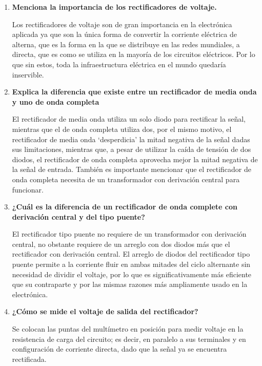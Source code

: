\documentclass[12pt]{article}
\begin{document}
        \begin{enumerate}
            \item \textbf{Menciona la importancia de los rectificadores de voltaje.}\par
                Los rectificadores de voltaje son de gran importancia en la electrónica aplicada ya que son la única forma de convertir
                la corriente eléctrica de alterna, que es la forma en la que se distribuye en las redes mundiales, a directa, que es como 
                se utiliza en la mayoría de los circuitos eléctricos. Por lo que sin estos, toda la infraestructura eléctrica en el mundo quedaría inservible. 
            \item \textbf{Explica la diferencia que existe entre un rectificador de media onda y uno de onda completa}\par
                El rectificador de media onda utiliza un solo diodo para rectificar la señal, mientras que el de onda completa utiliza dos, por el mismo motivo,
                el rectificador de media onda `desperdicia' la mitad negativa de la señal dadas sus limitaciones, mientras que, a pesar de utilizar la caída de tensión de
                dos diodos, el rectificador de onda completa aprovecha mejor la mitad negativa de la señal de entrada. También es importante mencionar que el rectificador de onda completa necesita de 
                un transformador con derivación central para funcionar.
            \item \textbf{¿Cuál es la diferencia de un rectificador de onda complete con derivación central y del tipo puente?}\par
                El rectificador tipo puente no requiere de un transformador con derivación central, no obstante requiere de un arreglo con dos diodos más que el rectificador con derivación
                central. El arreglo de diodos del rectificador tipo puente permite a la corriente fluir en ambas mitades del ciclo alternante sin necesidad de dividir el voltaje, por lo que es significativamente
                más eficiente que su contraparte y por las mismas razones más ampliamente usado en la electrónica.
            \item \textbf{¿Cómo se mide el voltaje de salida del rectificador?}\par
                Se colocan las puntas del multímetro en posición para medir voltaje en la resistencia de carga del circuito; es decir, en paralelo a sus terminales y en configuración
                de corriente directa, dado que la señal ya se encuentra rectificada.

\end{enumerate}
\end{document}

